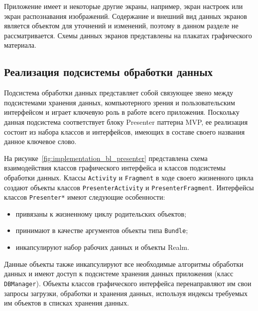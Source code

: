 Приложение имеет и некоторые другие экраны, например,
экран настроек или экран распознавания изображений.
Содержание и внешний вид данных экранов является объектом для
уточнений и изменений, поэтому в данном разделе не рассматривается.
Схемы данных экранов представлены на плакатах графического материала.


\subsection{Реализация подсистемы обработки данных}
\label{subsec:implementation_bl}

Подсистема обработки данных представляет собой связующее звено
между подсистемами хранения данных, компьютерного зрения и
пользовательским интерфейсом и играет ключевую роль в работе всего приложения.
Поскольку данная подсистема соответствует блоку Presenter паттерна
MVP, ее реализация состоит из набора классов и интерфейсов,
имеющих в составе своего названия данное ключевое слово.

На рисунке~\ref{fig:implementation_bl_presenter} представлена схема взаимодействия
классов графического интерфейса и классов подсистемы обработки данных.
Классы \texttt{Activity} и \texttt{Fragment} в ходе своего жизненного цикла
создают объекты классов \texttt{PresenterActivity} и \texttt{PresenterFragment}.
Интерфейсы классов \texttt{Presenter*} имеют следующие особенности:
\begin{itemize}
  \item привязаны к жизненному циклу родительских объектов;
  \item принимают в качестве аргументов объекты типа \texttt{Bundle};
  \item инкапсулируют набор рабочих данных и объекты Realm.
\end{itemize}

Данные объекты также инкапсулируют все необходимые алгоритмы обработки данных и
имеют доступ к подсистеме хранения данных приложения (класс \texttt{DBManager}).
Объекты классов графического интерфейса перенаправляют
им свои запросы загрузки, обработки и хранения данных,
используя индексы требуемых им объектов в списках хранения данных.

